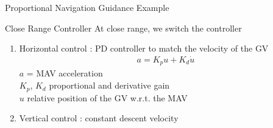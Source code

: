 \begin{frame}{Proportional Navigation Guidance Example}

\begin{center}
\end{center}

\end{frame}




\begin{frame}{Close Range Controller}
	At close range, we switch the controller
	\begin{enumerate}
		\item Horizontal control : PD controller to match the velocity of the GV
	\begin{align*}
		a = K_p u + K_d \dot{u}
	\end{align*}
	$a$ = MAV acceleration \\
	$K_p$, $K_d$ proportional and derivative gain \\
	$u$ relative position of the GV w.r.t. the MAV
		\item Vertical control : constant descent velocity
	\end{enumerate} 
\end{frame}

